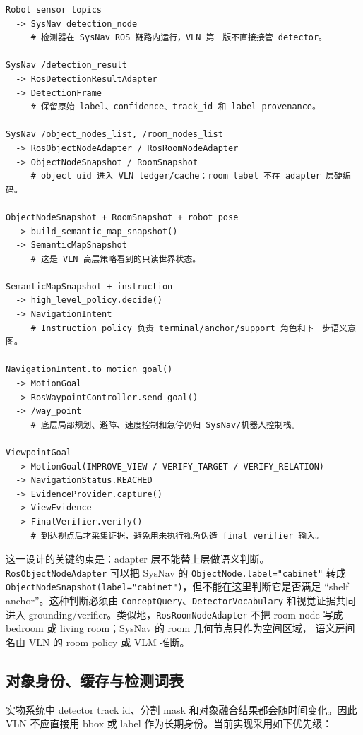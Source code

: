 \documentclass[UTF8,zihao=-4]{ctexart}
\begin{document}
\begin{lstlisting}[style=pseudo,caption={Real-robot runtime dataflow}]
Robot sensor topics
  -> SysNav detection_node
     # 检测器在 SysNav ROS 链路内运行，VLN 第一版不直接接管 detector。

SysNav /detection_result
  -> RosDetectionResultAdapter
  -> DetectionFrame
     # 保留原始 label、confidence、track_id 和 label provenance。

SysNav /object_nodes_list, /room_nodes_list
  -> RosObjectNodeAdapter / RosRoomNodeAdapter
  -> ObjectNodeSnapshot / RoomSnapshot
     # object uid 进入 VLN ledger/cache；room label 不在 adapter 层硬编码。

ObjectNodeSnapshot + RoomSnapshot + robot pose
  -> build_semantic_map_snapshot()
  -> SemanticMapSnapshot
     # 这是 VLN 高层策略看到的只读世界状态。

SemanticMapSnapshot + instruction
  -> high_level_policy.decide()
  -> NavigationIntent
     # Instruction policy 负责 terminal/anchor/support 角色和下一步语义意图。

NavigationIntent.to_motion_goal()
  -> MotionGoal
  -> RosWaypointController.send_goal()
  -> /way_point
     # 底层局部规划、避障、速度控制和急停仍归 SysNav/机器人控制栈。

ViewpointGoal
  -> MotionGoal(IMPROVE_VIEW / VERIFY_TARGET / VERIFY_RELATION)
  -> NavigationStatus.REACHED
  -> EvidenceProvider.capture()
  -> ViewEvidence
  -> FinalVerifier.verify()
     # 到达视点后才采集证据，避免用未执行视角伪造 final verifier 输入。
\end{lstlisting}

这一设计的关键约束是：adapter 层不能替上层做语义判断。\texttt{RosObjectNodeAdapter}
可以把 SysNav 的 \texttt{ObjectNode.label="cabinet"} 转成
\texttt{ObjectNodeSnapshot(label="cabinet")}，但不能在这里判断它是否满足
``shelf anchor''。这种判断必须由 \texttt{ConceptQuery}、\texttt{DetectorVocabulary}
和视觉证据共同进入 grounding/verifier。类似地，\texttt{RosRoomNodeAdapter}
不把 room node 写成 bedroom 或 living room；SysNav 的 room 几何节点只作为空间区域，
语义房间名由 VLN 的 room policy 或 VLM 推断。

\subsection{对象身份、缓存与检测词表}

实物系统中 detector track id、分割 mask 和对象融合结果都会随时间变化。因此
VLN 不应直接用 bbox 或 label 作为长期身份。当前实现采用如下优先级：
\end{document}
